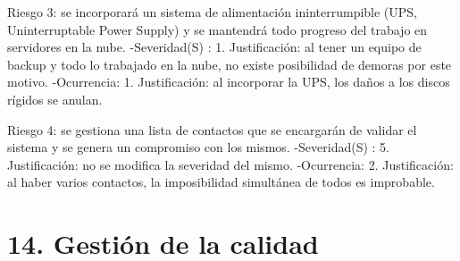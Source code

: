 \documentclass[
11pt, %
]{charter}
\begin{document}
Riesgo 3: se incorporará un sistema de alimentación ininterrumpible (UPS,  Uninterruptable Power Supply) y se mantendrá todo progreso del trabajo en servidores en la nube.\newline
-Severidad(S) : 1.\newline
Justificación: al tener un equipo de backup y todo lo trabajado en la nube, no existe posibilidad de demoras por este motivo.\newline
-Ocurrencia: 1.\newline
Justificación: al incorporar la UPS, los daños a los discos rígidos se anulan.
 
Riesgo 4: se gestiona una lista de contactos que se encargarán de validar el sistema y se genera un compromiso con los mismos.\newline
-Severidad(S) : 5.\newline
Justificación: no se modifica la severidad del mismo.
\newline
-Ocurrencia: 2.\newline
Justificación: al haber varios contactos, la imposibilidad simultánea de todos es improbable.\newline

\section{14. Gestión de la calidad}
\label{sec:calidad}
\end{document}
